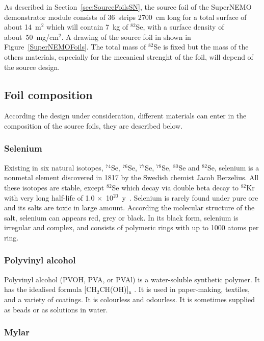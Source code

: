 \documentclass[main.tex]{subfiles}
\begin{document}
\NI As described in Section~\ref{sec:SourceFoilsSN}, the source foil of the SuperNEMO demonstrator module consists of 36~strips 2700~cm long for a total surface of about 14~m$^\text{2}$ which will contain 7~kg of $^{\text{82}}$Se, with a surface density of about~50~mg/cm$^\text{2}$. A drawing of the source foil in shown in Figure~\ref{SuperNEMOFoils}. The total mass of $^{\text{82}}$Se is fixed but the mass of the others materials, especially for the mecanical strenght of the foil, will depend of the source design.


\subsection{Foil composition}


\NI According the design under consideration, different materials can enter in the composition of the source foils, they are described below.


\subsubsection{Selenium}


\NI Existing in six natural isotopes, $^{\text{74}}$Se, $^{\text{76}}$Se, $^{\text{77}}$Se, $^{\text{78}}$Se, $^{\text{80}}$Se and $^{\text{82}}$Se, selenium is a nonmetal element discovered in 1817 by the Swedish chemist Jacob Berzelius. All these isotopes are stable, except $^{\text{82}}$Se which decay via double beta decay to $^{\text{82}}$Kr with very long half-life of 1.0 $\times$~10$^{\text{20}}$~y~\cite{NEMO3:Se82}. Selenium is rarely found under pure ore and its salts are toxic in large amount. According the molecular structure of the salt, selenium can appears red, grey or black. In its black form, selenium is irregular and complex, and consists of polymeric rings with up to 1000 atoms per ring. 


\subsubsection{Polyvinyl alcohol}


\NI Polyvinyl alcohol (PVOH, PVA, or PVAl) is a water-soluble synthetic polymer. It has the idealised formula [CH$_\text{2}$CH(OH)]$_\text{n}$ . It is used in paper-making, textiles, and a variety of coatings. It is colourless and odourless. It is sometimes supplied as beads or as solutions in water.


\subsubsection{Mylar}
\end{document}
